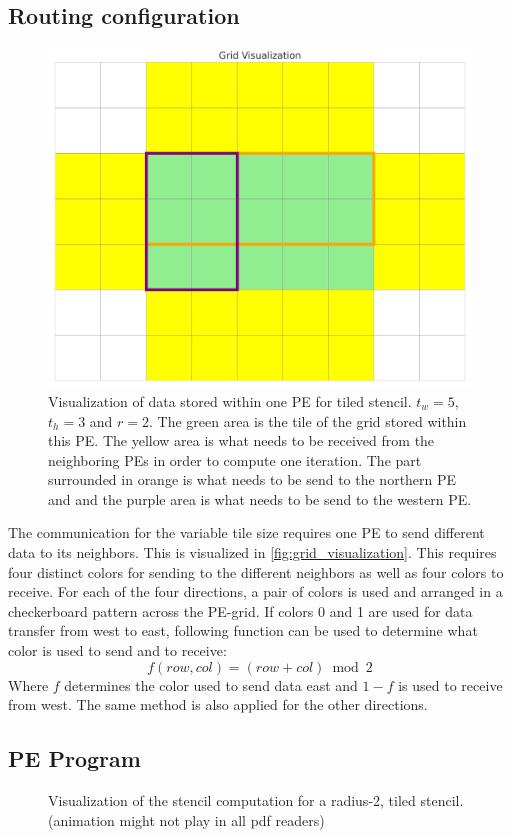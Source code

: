 \subsection{Routing configuration}
\begin{figure}
    \centering
    \includegraphics[width=0.5\linewidth]{grid_visualization.png}
    \caption{Visualization of data stored within one PE for tiled stencil. $t_w=5$, $t_h=3$ and $r=2$. The green area is the tile of the grid stored within this PE. The yellow area is what needs to be received from the neighboring PEs in order to compute one iteration. The part surrounded in orange is what needs to be send to the northern PE and and the purple area is what needs to be send to the western PE.}
    \label{fig:grid_visualization}
\end{figure}
The communication for the variable tile size requires one PE to send different data to its neighbors. This is visualized in \autoref{fig:grid_visualization}. This requires four distinct colors for sending to the different neighbors as well as four colors to receive. For each of the four directions, a pair of colors is used and arranged in a checkerboard pattern across the PE-grid.
If colors 0 and 1 are used for data transfer from west to east, following function can be used to determine what color is used to send and to receive:
\begin{equation}
    \label{eq:tiled_coloring_function}
    f(row, col)=(row+col) \bmod 2
\end{equation}
Where $f$ determines the color used to send data east and $1-f$ is used to receive from west. The same method is also applied for the other directions.

\subsection{PE Program}

\begin{figure}
    \centering
    \caption{Visualization of the stencil computation for a radius-2, tiled stencil. (animation might not play in all pdf readers)}
    \label{fig:stencil_algorithm_animation}
\end{figure}

